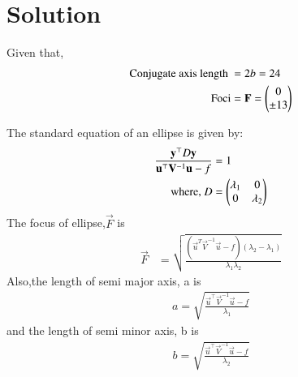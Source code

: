 \documentclass[journal,12pt,twocolumn]{IEEEtran}
\begin{document}
\section{Solution}
Given that,
\begin{align}
\text{Conjugate axis length }&= 2b = 24 \label{eqA}
  \\
\text{Foci}&=\mathbf{F}= \begin{pmatrix}0\\\pm13\end{pmatrix}  
\end{align}
\begin{lemma}
\label{lemma}
The standard equation of an ellipse is given by:
\begin{align}
\frac{\mathbf{y}^{\top}D\mathbf{y}}{\mathbf{u}^{\top}\mathbf{V}^{-1}\mathbf{u}-f}&=1\label{eqA}
\\
\text{where, } D &=\begin{pmatrix}\lambda_1& 0 \\ 0 & \lambda_2\end{pmatrix}
\end{align}
The focus of ellipse,$\vec{F}$ is 
 \begin{align}
  \vec{F} &= \sqrt{\frac{(\vec{u}^T\vec{V}^{-1}\vec{u}-f)(\lambda_2-\lambda_1)}{\lambda_1\lambda_2}} \label{eqZ}
\end{align}
Also,the length of semi major axis, a is
\begin{align}
  a = \sqrt{\frac{\vec{u}^{\top}\vec{V}^{-1}\vec{u}-f}{\lambda_1}} \label{eq1}
  \end{align}
 and the length of semi minor axis, b is
  \begin{align}
  b = \sqrt{\frac{\vec{u}^{\top}\vec{V}^{-1}\vec{u}-f}{\lambda_2}}
\end{align}
\end{lemma}
\end{document}
